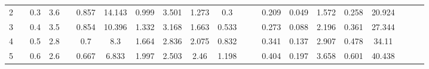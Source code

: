 \documentclass[a4paper,12pt]{article}
\begin{document}
\begin{table}[htp]
\begin{adjustwidth}{-3.3cm}{}
\begin{tabular}{|c|c|c|c|c|c|c|c|c|c|c|c|c|c|c|c|c|c|c|c|c|}
2 &                                 & 0.3                            & 3.6                           &                                          & 0.857                            & 14.143                           & 0.999                           & 3.501                           & 1.273                             & 0.3                               &                                    &                                   & 0.209              & 0.049              & 1.572                           & 0.258            & 20.924                          &                                                  &                                            &                                                 \\ \cline{1-1} \cline{3-4} \cline{6-11} \cline{14-18}
3 &                                 & 0.4                            & 3.5                           &                                          & 0.854                            & 10.396                           & 1.332                           & 3.168                           & 1.663                             & 0.533                             &                                    &                                   & 0.273              & 0.088              & 2.196                           & 0.361            & 27.344                          &                                                  &                                            &                                                 \\ \cline{1-1} \cline{3-4} \cline{6-11} \cline{14-18}
4 &                                 & 0.5                            & 2.8                           &                                          & 0.7                              & 8.3                              & 1.664                           & 2.836                           & 2.075                             & 0.832                             &                                    &                                   & 0.341              & 0.137              & 2.907                           & 0.478            & 34.11                           &                                                  &                                            &                                                 \\ \cline{1-1} \cline{3-4} \cline{6-11} \cline{14-18}
5 &                                 & 0.6                            & 2.6                           &                                          & 0.667                            & 6.833                            & 1.997                           & 2.503                           & 2.46                              & 1.198                             &                                    &                                   & 0.404              & 0.197              & 3.658                           & 0.601            & 40.438                          &                                                  &                                            &                                                 \\ \cline{1-1} \cline{3-4} \cline{6-11} \cline{14-18}

\end{tabular}
\end{adjustwidth}
\end{table}
\end{document}
